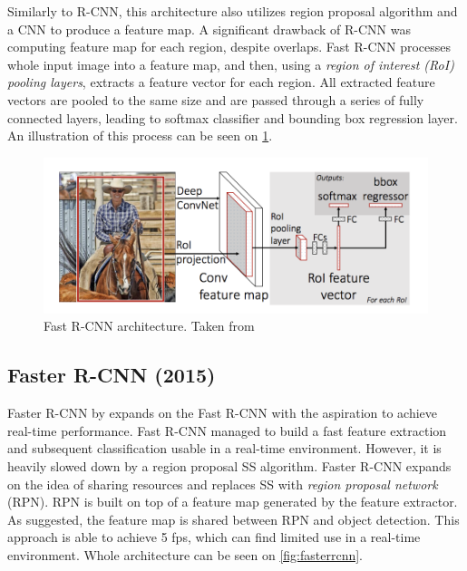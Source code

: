 Similarly to R-CNN, this architecture also utilizes region proposal algorithm and a CNN to produce a feature map. A significant drawback of R-CNN was computing feature map for each region, despite overlaps. Fast R-CNN processes whole input image into a feature map, and then, using a \textit{region of interest (RoI) pooling layers}, extracts a feature vector for each region. All extracted feature vectors are pooled to the same size and are passed through a series of fully connected layers, leading to softmax classifier and bounding box regression layer. An illustration of this process can be seen on \cref{fig:fastrcnn}.

\begin{figure}
    \centering
    \includegraphics[width=\textwidth]{img/fastrcnn}
    \caption[Fast R-CNN architecture]%
    {Fast R-CNN architecture. Taken from \cite[fig. 1]{bib:fastrcnn}}
    \label{fig:fastrcnn}
\end{figure}

\subsection{Faster R-CNN (2015)}
 
Faster R-CNN by \citeauthor{bib:fasterrcnn} \cite{bib:fasterrcnn} expands on the Fast R-CNN with the aspiration to achieve real-time performance. Fast R-CNN managed to build a fast feature extraction and subsequent classification usable in a real-time environment. However, it is heavily slowed down by a region proposal SS algorithm. Faster R-CNN expands on the idea of sharing resources and replaces SS with \textit{region proposal network} (RPN). RPN is built on top of a feature map generated by the feature extractor. As suggested, the feature map is shared between RPN and object detection. This approach is able to achieve 5 fps, which can find limited use in a real-time environment. Whole architecture can be seen on \cref{fig:fasterrcnn}. 
 
